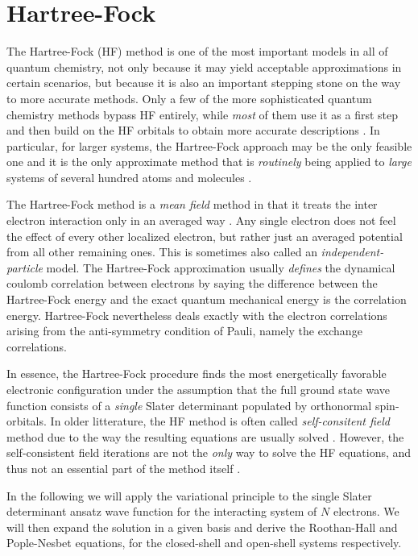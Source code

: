 \documentclass[../../master.tex]{subfiles}
\begin{document}
\renewcommand{\R}{{\bf R}}
\renewcommand{\r}{{\bf r}}
\newcommand{\x}{{\bf x}}
\newcommand{\psiz}{|\Psi_0\rangle}


\chapter{Hartree-Fock \label{HF}}
The Hartree-Fock (HF) method is one of the most important models in all of quantum chemistry, not only because it may yield acceptable approximations in certain scenarios, but because it is also an important stepping stone on the way to more accurate methods. Only a few of the more sophisticated quantum chemistry methods bypass HF entirely, while \emph{most} of them use it as a first step and then build on the HF orbitals to obtain more accurate descriptions \cite{szabo}. In particular, for larger systems, the Hartree-Fock approach may be the only feasible one and it is the only approximate method that is \emph{routinely} being applied to \emph{large} systems of several hundred atoms and molecules \cite{helgaker}.

The Hartree-Fock method is a \emph{mean field} method in that it treats the inter electron interaction only in an averaged way \cite{kvaal}. Any single electron does not feel the effect of every other localized electron, but rather just an averaged potential from all other remaining ones. This is sometimes also called an \emph{independent-particle} model. The Hartree-Fock approximation usually \emph{defines} the dynamical coulomb correlation between electrons by saying the difference between the Hartree-Fock energy and the exact quantum mechanical energy is the correlation energy. Hartree-Fock nevertheless deals exactly with the electron correlations arising from the anti-symmetry condition of Pauli, namely the exchange correlations. 

In essence, the Hartree-Fock procedure finds the most energetically favorable electronic configuration under the assumption that the full ground state wave function consists of a \emph{single} Slater determinant populated by orthonormal spin-orbitals. In older litterature, the HF method is often called \emph{self-consitent field} method due to the way the resulting equations are usually solved \cite{levine}. However, the self-consistent field iterations are not the \emph{only} way to solve the HF equations, and thus not an essential part of the method itself \cite{helgaker}.

In the following we will apply the variational principle to the single Slater determinant ansatz wave function for the interacting system of $N$ electrons. We will then expand the solution in a given basis and derive the Roothan-Hall and Pople-Nesbet equations, for the closed-shell and open-shell systems respectively. 
\end{document}
